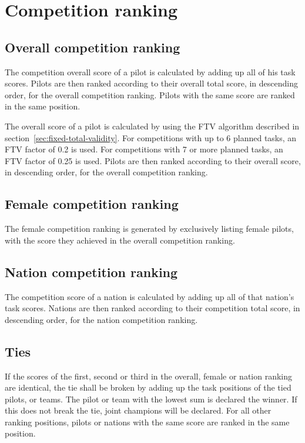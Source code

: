 \documentclass{article}
\begin{document}
\newpage
\section{Competition ranking}
\label{sec:competition-ranking}
\subsection{Overall competition ranking}
\label{sec:overall-competition-ranking}
\begin{hg}
The competition overall score of a pilot is calculated by adding up all of his
task scores. Pilots are then ranked according to their overall total score, in
descending order, for the overall competition ranking. Pilots with the same
score are ranked in the same position.
\end{hg}

\begin{pg}
The overall score of a pilot is calculated by using the FTV algorithm described
in section~\ref{sec:fixed-total-validity}. For competitions with up to
6 planned tasks, an FTV factor of 0.2 is used. For competitions with 7 or more
planned tasks, an FTV factor of 0.25 is used. Pilots are then ranked according
to their overall score, in descending order, for the overall competition
ranking.\footnotemark
\end{pg}

\subsection{Female competition ranking}
The female competition ranking is generated by exclusively listing female
pilots, with the score they achieved in the overall competition ranking.

\subsection{Nation competition ranking}
The competition score of a nation is calculated by adding up all of that
nation’s task scores. Nations are then ranked according to their competition
total score, in descending order, for the nation competition ranking.

\subsection{Ties}
If the scores of the first, second or third in the overall, female or nation
ranking are identical, the tie shall be broken by adding up the task positions
of the tied pilots, or teams. The pilot or team with the lowest sum is declared
the winner. If this does not break the tie, joint champions will be declared.
For all other ranking positions, pilots or nations with the same score are
ranked in the same position.
\end{document}
